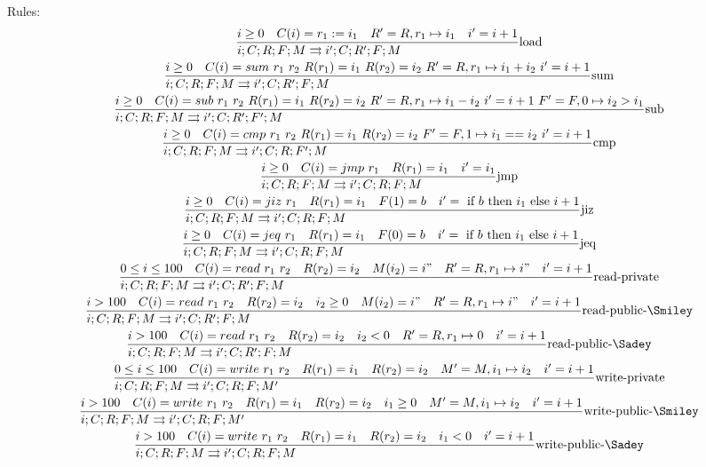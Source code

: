 \documentclass{article}
\newcommand{\execs}[0]{\ensuremath{\rightrightarrows}}
\begin{document}
Rules:
\begin{gather*}
    \st[load]{i;C;R;F;M \execs i';C;R';F;M}{
        i\geq 0 \quad
        C(i)=r_1:=i_1 \quad
        R'=R,r_1\mapsto i_1 \quad
        i'=i+1
    } \\
    \st[sum]{i;C;R;F;M \execs i';C;R';F;M}{
        i\geq 0 \quad
        C(i)=sum\ r_1\ r_2 \ 
        R(r_1)=i_1 \ 
        R(r_2)=i_2 \ 
        R'=R,r_1\mapsto i_1+i_2 \ 
        i'=i+1
    } \\
    \st[sub]{i;C;R;F;M \execs i';C;R';F';M}{
        i\geq 0 \quad
        C(i)=sub\ r_1\ r_2 \ 
        R(r_1)=i_1 \ 
        R(r_2)=i_2 \ 
        R'=R,r_1\mapsto i_1-i_2 \ 
        i'=i+1 \
        F'=F,0\mapsto i_2>i_1
    } \\
    \st[cmp]{i;C;R;F;M \execs i';C;R;F';M}{
        i\geq 0 \quad
        C(i)=cmp\ r_1\ r_2 \ 
        R(r_1)=i_1 \ 
        R(r_2)=i_2 \ 
        F'=F,1\mapsto i_1==i_2 \
        i'=i+1
    } \\
    \st[jmp]{i;C;R;F;M \execs i';C;R;F;M}{
        i\geq 0 \quad
        C(i)=jmp\ r_1 \quad
        R(r_1)=i_1 \quad
        i'=i_1
    } \\
    \st[jiz]{i;C;R;F;M \execs i';C;R;F;M}{
        i\geq 0 \quad
        C(i)=jiz\ r_1 \quad
        R(r_1)=i_1 \quad
        F(1)=b \quad
        i'=\IF b \THEN i_1 \ELSE i+1
    } \\
    \st[jeq]{i;C;R;F;M \execs i';C;R;F;M}{
        i\geq 0 \quad
        C(i)=jeq\ r_1 \quad
        R(r_1)=i_1 \quad
        F(0)=b \quad
        i'=\IF b \THEN i_1 \ELSE i+1
    } \\
    \st[read-private]{i;C;R;F;M \execs i';C;R';F;M}{
        0\leq i\leq 100 \quad
        C(i)=read\ r_1\ r_2 \quad
        R(r_2)=i_2 \quad
        M(i_2) = i" \quad
        R' = R,r_1\mapsto i" \quad
        i'=i+1
    } \\
    \st[read-public-\Smiley]{i;C;R;F;M \execs i';C;R';F;M}{
        i>100 \quad
        C(i)=read\ r_1\ r_2 \quad
        R(r_2)=i_2 \quad
        i_2\geq 0 \quad
        M(i_2) = i" \quad
        R' = R,r_1\mapsto i" \quad
        i'=i+1
    } \\
    \st[read-public-\Sadey]{i;C;R;F;M \execs i';C;R';F;M}{
        i>100 \quad
        C(i)=read\ r_1\ r_2 \quad
        R(r_2)=i_2 \quad
        i_2 < 0 \quad
        R' = R,r_1\mapsto 0 \quad
        i'=i+1
    } \\
    \st[write-private]{i;C;R;F;M \execs i';C;R;F;M'}{
        0\leq i\leq 100 \quad
        C(i)=write\ r_1\ r_2 \quad
        R(r_1)=i_1 \quad
        R(r_2)=i_2 \quad
        M' = M,i_1\mapsto i_2 \quad
        i'=i+1
    } \\
    \st[write-public-\Smiley]{i;C;R;F;M \execs i';C;R;F;M'}{
        i>100 \quad
        C(i)=write\ r_1\ r_2 \quad
        R(r_1)=i_1 \quad
        R(r_2)=i_2 \quad
        i_1\geq 0 \quad
        M' = M,i_1\mapsto i_2 \quad
        i'=i+1
    } \\
    \st[write-public-\Sadey]{i;C;R;F;M \execs i';C;R;F;M}{
        i>100 \quad
        C(i)=write\ r_1\ r_2 \quad
        R(r_1)=i_1 \quad
        R(r_2)=i_2 \quad
        i_1<0 \quad
        i'=i+1
    }
\end{gather*}
\setstretch{1}
\end{document}
